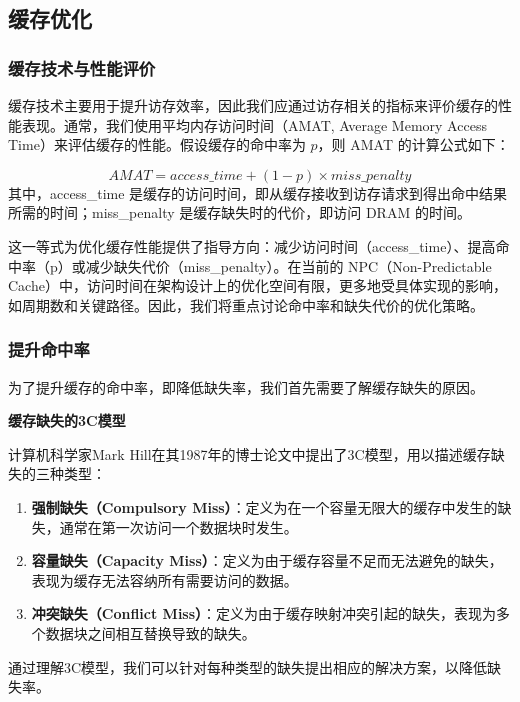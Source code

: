 \subsection{缓存优化}\label{sec:09-cache-026}

\subsubsection{缓存技术与性能评价}\label{sec:09-cache-027}

缓存技术主要用于提升访存效率，因此我们应通过访存相关的指标来评价缓存的性能表现。通常，我们使用平均内存访问时间（AMAT, Average Memory Access Time）来评估缓存的性能。假设缓存的命中率为 \(p\)，则 AMAT 的计算公式如下：

\[
AMAT = access\_time + (1 - p) \times miss\_penalty
\]
其中，access\_time 是缓存的访问时间，即从缓存接收到访存请求到得出命中结果所需的时间；miss\_penalty 是缓存缺失时的代价，即访问 DRAM 的时间。

这一等式为优化缓存性能提供了指导方向：减少访问时间（access\_time）、提高命中率（p）或减少缺失代价（miss\_penalty）。在当前的 NPC（Non-Predictable Cache）中，访问时间在架构设计上的优化空间有限，更多地受具体实现的影响，如周期数和关键路径。因此，我们将重点讨论命中率和缺失代价的优化策略。

\subsubsection{提升命中率}\label{sec:09-cache-028}

为了提升缓存的命中率，即降低缺失率，我们首先需要了解缓存缺失的原因。

\textbf{缓存缺失的3C模型}

计算机科学家Mark Hill在其1987年的博士论文中提出了3C模型，用以描述缓存缺失的三种类型：

\begin{enumerate}
\def\labelenumi{\arabic{enumi}.}
\tightlist
\item
  \textbf{强制缺失（Compulsory Miss）}：定义为在一个容量无限大的缓存中发生的缺失，通常在第一次访问一个数据块时发生。
\item
  \textbf{容量缺失（Capacity Miss）}：定义为由于缓存容量不足而无法避免的缺失，表现为缓存无法容纳所有需要访问的数据。
\item
  \textbf{冲突缺失（Conflict Miss）}：定义为由于缓存映射冲突引起的缺失，表现为多个数据块之间相互替换导致的缺失。
\end{enumerate}

通过理解3C模型，我们可以针对每种类型的缺失提出相应的解决方案，以降低缺失率。

